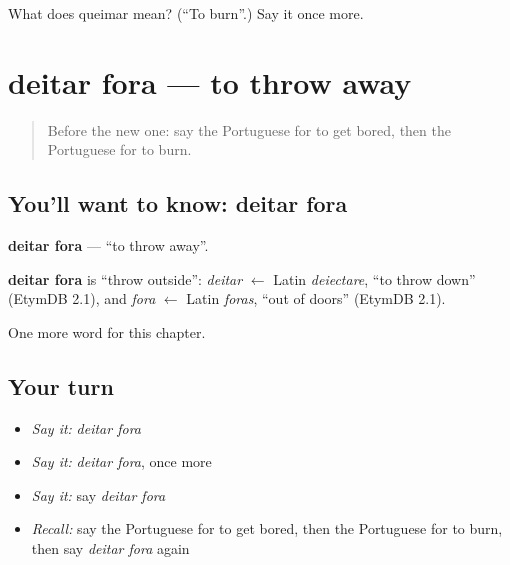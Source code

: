 \begin{tcolorbox}[breakable,colback=teal!4,colframe=teal!35!black,title={Before you move on}]
What does queimar mean? (\textquotedblleft{}To burn\textquotedblright{}.) Say it once more.
\end{tcolorbox}
\section[deitar fora]{deitar fora — to throw away}

\label{lesson:PT-C204-deitar-fora}



\begin{quote}
Before the new one: say the Portuguese for to get bored, then the Portuguese for to burn.
\end{quote}

\subsection*{You'll want to know: deitar fora}
\textbf{deitar fora} — \textquotedblleft{}to throw away\textquotedblright{}.

\begin{cousinweb}
\textbf{deitar fora} is \textquotedblleft{}throw outside\textquotedblright{}: \emph{deitar} $\leftarrow$ Latin \emph{deiectare}, \textquotedblleft{}to throw down\textquotedblright{} (EtymDB 2.1), and \emph{fora} $\leftarrow$ Latin \emph{foras}, \textquotedblleft{}out of doors\textquotedblright{} (EtymDB 2.1).
\end{cousinweb}

\begin{grammarlens}[title={What you've built}]
One more word for this chapter.
\end{grammarlens}

\subsection*{Your turn}
\begin{itemize}
\raggedright
  \item \emph{Say it:} \emph{deitar fora}
  \item \emph{Say it:} \emph{deitar fora}, once more
  \item \emph{Say it:} say \emph{deitar fora}
  \item \emph{Recall:} say the Portuguese for to get bored, then the Portuguese for to burn, then say \emph{deitar fora} again
\end{itemize}

